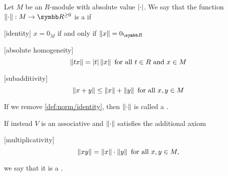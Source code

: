 \begin{definition}\label{def:norm}
  Let \( M \) be an \( R \)-module with absolute value \( \left\vert \cdot \right\vert \). We say that the function \( \Norm{\cdot}: M \to \R^{\geq 0} \) is a  if
  \begin{description}
    [identity] \( x = 0_M \) if and only if \( \Norm x = 0_{\R} \)

    [absolute homogeneity]
    \begin{equation*}
      \left\Vert t x \right\Vert = \left\vert t \right\vert \left\Vert x \right\Vert \text{ for all } t \in R \text{ and } x \in M
    \end{equation*}

    [subadditivity] 
    \begin{equation*}
      \left\Vert x + y \right\Vert \leq \left\Vert x \right\Vert + \left\Vert y \right\Vert \text{ for all } x, y \in M
    \end{equation*}
  \end{description}

  If we remove \ref{def:norm/identity}, then \( \left\Vert \cdot \right\Vert \) is called a .

  If instead \( V \) is an associative and \( \left\Vert \cdot \right\Vert \) satisfies the additional axiom
  \begin{description}
    [multiplicativity]
    \begin{equation*}
      \left\Vert xy \right\Vert = \left\Vert x \right\Vert \cdot \left\Vert y \right\Vert \text{ for all } x, y \in M,
    \end{equation*}
  \end{description}
  we say that it is a .
\end{definition}

